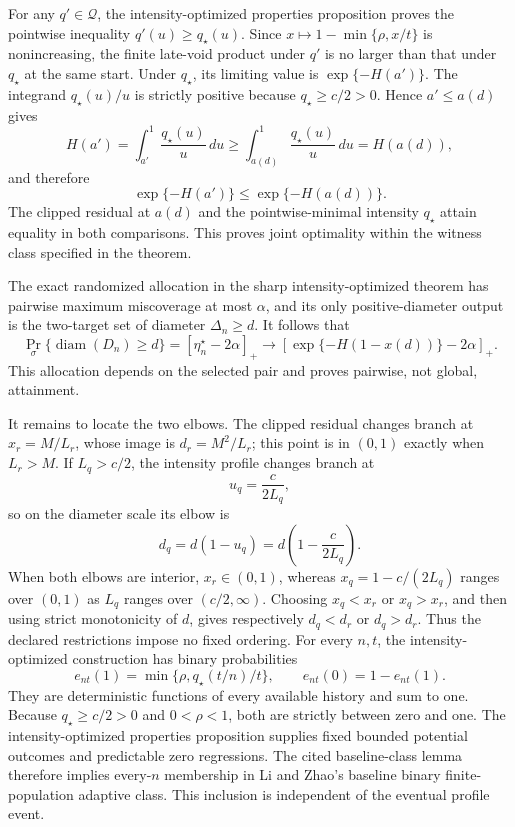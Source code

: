 For any \(q'\in\mathcal Q\), the intensity-optimized properties proposition proves the pointwise inequality \(q'(u)\ge q_\star(u)\).  Since \(x\mapsto1-\min\{\rho,x/t\}\) is nonincreasing, the finite late-void product under \(q'\) is no larger than that under \(q_\star\) at the same start.  Under \(q_\star\), its limiting value is \(\exp\{-H(a')\}\).  The integrand \(q_\star(u)/u\) is strictly positive because \(q_\star\ge c/2>0\).  Hence \(a'\le a(d)\) gives
\[
 H(a')=\int_{a'}^1\frac{q_\star(u)}u\,du
 \ge\int_{a(d)}^1\frac{q_\star(u)}u\,du=H(a(d)),
\]
and therefore
\[
 \exp\{-H(a')\}\le\exp\{-H(a(d))\}.
\]
The clipped residual at \(a(d)\) and the pointwise-minimal intensity \(q_\star\) attain equality in both comparisons.  This proves joint optimality within the witness class specified in the theorem.

The exact randomized allocation in the sharp intensity-optimized theorem has pairwise maximum miscoverage at most \(\alpha\), and its only positive-diameter output is the two-target set of diameter \(\Delta_n\ge d\).  It follows that
\[
 \Pr_\sigma\{\operatorname{diam}(D_n)\ge d\}
 =[\eta_n^\star-2\alpha]_+
 \longrightarrow
 \left[\exp\{-H(1-x(d))\}-2\alpha\right]_+.
\]
This allocation depends on the selected pair and proves pairwise, not global, attainment.

It remains to locate the two elbows.  The clipped residual changes branch at \(x_r=M/L_r\), whose image is \(d_r=M^2/L_r\); this point is in \((0,1)\) exactly when \(L_r>M\).  If \(L_q>c/2\), the intensity profile changes branch at
\[
 u_q=\frac{c}{2L_q},
\]
so on the diameter scale its elbow is
\[
 d_q=d(1-u_q)=d\!\left(1-\frac{c}{2L_q}\right).
\]
When both elbows are interior, \(x_r\in(0,1)\), whereas \(x_q=1-c/(2L_q)\) ranges over \((0,1)\) as \(L_q\) ranges over \((c/2,\infty)\).  Choosing \(x_q<x_r\) or \(x_q>x_r\), and then using strict monotonicity of \(d\), gives respectively \(d_q<d_r\) or \(d_q>d_r\).  Thus the declared restrictions impose no fixed ordering.
For every \(n,t\), the intensity-optimized construction has binary probabilities
\[
 e_{nt}(1)=\min\{\rho,q_\star(t/n)/t\},
 \qquad
 e_{nt}(0)=1-e_{nt}(1).
\]
They are deterministic functions of every available history and sum to one.  Because \(q_\star\ge c/2>0\) and \(0<\rho<1\), both are strictly between zero and one.  The intensity-optimized properties proposition supplies fixed bounded potential outcomes and predictable zero regressions.  The cited baseline-class lemma therefore implies every-\(n\) membership in Li and Zhao's baseline binary finite-population adaptive class.  This inclusion is independent of the eventual profile event.

